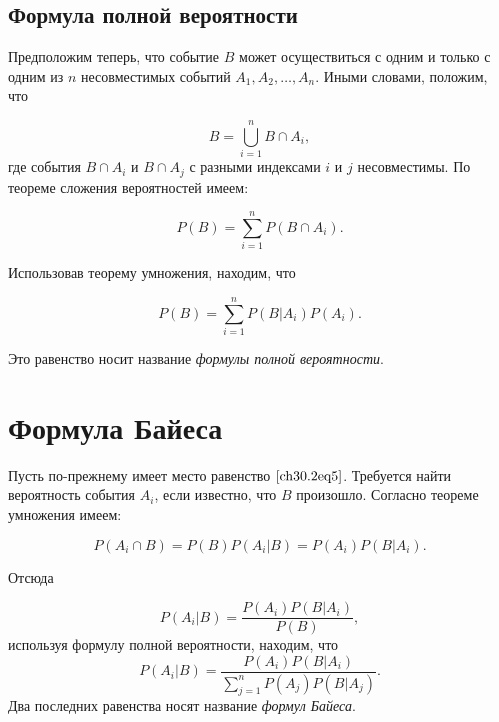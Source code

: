 \subsection{Формула полной вероятности}
Предположим теперь, что событие $B$ может осуществиться с одним и только с одним из $n$ несовместимых событий $A_1,A_2, \ldots, A_n$. Иными словами, положим, что

\begin{equation} \label{ch30.2eq5}
B = \bigcup\limits_{i = 1}^{n} B \cap A_i,
\end{equation}
где события $B\cap A_i$ и $B\cap A_j$ с разными индексами $i$ и $j$ несовместимы. По теореме сложения вероятностей имеем:

$$
P(B) = \sum_{i = 1}^{n} P(B\cap A_i).
$$

Использовав теорему умножения, находим, что

$$
P(B) = \sum_{i = 1}^{n} P(B|A_i)P(A_i).
$$

Это равенство носит название \textit{формулы полной вероятности}.

\section{Формула Байеса}
Пусть по-прежнему имеет место равенство $\eqref{ch30.2eq5}$. Требуется найти вероятность события $A_i$, если известно, что $B$ произошло. Согласно теореме умножения имеем:

$$
P(A_i\cap B) = P(B)P(A_i|B) = P(A_i)P(B|A_i).
$$

Отсюда

$$
P(A_i|B) = \frac{P(A_i)P(B|A_i)}{P(B)},
$$
используя формулу полной вероятности, находим, что
$$
P(A_i|B) = \frac{P(A_i)P(B|A_i)}{\sum\limits_{j = 1}^{n} P(A_j)P(B|A_j)}.
$$
Два последних равенства носят название \textit{формул Байеса}.
